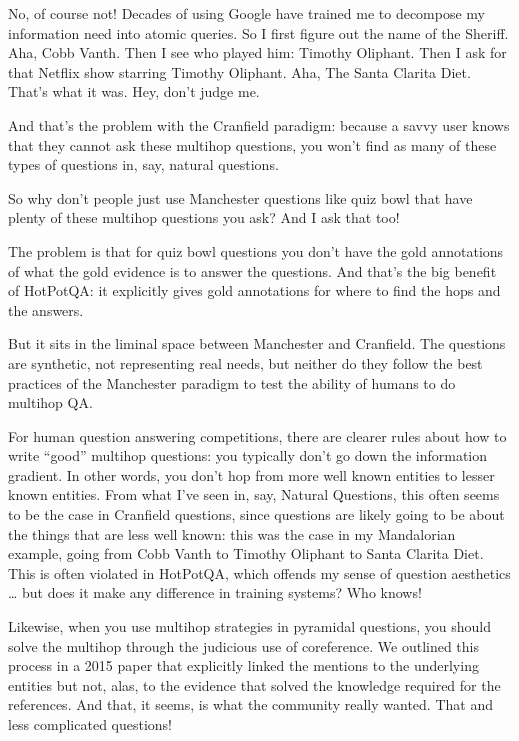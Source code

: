 No, of course not!  Decades of using Google have trained me to decompose my information need into atomic queries.  So I first figure out the name of the Sheriff.  Aha, Cobb Vanth.  Then I see who played him: Timothy Oliphant.  Then I ask for that Netflix show starring Timothy Oliphant.  Aha, The Santa Clarita Diet.  That’s what it was.  Hey, don’t judge me.

And that’s the problem with the Cranfield paradigm: because a savvy user knows that they cannot ask these multihop questions, you won’t find as many of these types of questions in, say, natural questions.  

So why don’t people just use Manchester questions like quiz bowl that have plenty of these multihop questions you ask?  And I ask that too!

The problem is that for quiz bowl questions you don’t have the gold annotations of what the gold evidence is to answer the questions.  And that’s the big benefit of HotPotQA: it explicitly gives gold annotations for where to find the hops and the answers. 

But it sits in the liminal space between Manchester and Cranfield.  The questions are synthetic, not representing real needs, but neither do they follow the best practices of the Manchester paradigm to test the ability of humans to do multihop QA.

For human question answering competitions, there are clearer rules about how to write “good” multihop questions: you typically don’t go down the information gradient.  In other words, you don’t hop from more well known entities to lesser known entities.  From what I’ve seen in, say, Natural Questions, this often seems to be the case in Cranfield questions, since questions are likely going to be about the things that are less well known: this was the case in my Mandalorian example, going from Cobb Vanth to Timothy Oliphant to Santa Clarita Diet.  This is often violated in HotPotQA, which offends my sense of question aesthetics … but does it make any difference in training systems?  Who knows!  

Likewise, when you use multihop strategies in pyramidal questions, you should solve the multihop through the judicious use of coreference.  We outlined this process in a 2015 paper that explicitly linked the mentions to the underlying entities but not, alas, to the evidence that solved the knowledge required for the references.  And that, it seems, is what the community really wanted.  That and less complicated questions!

